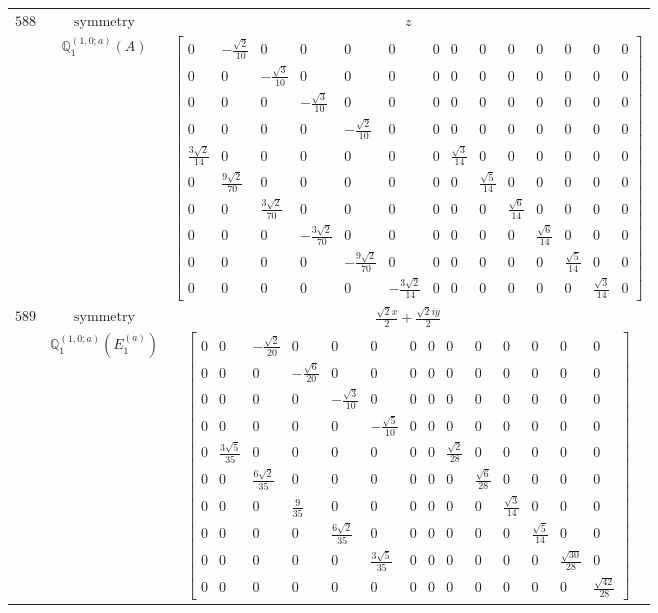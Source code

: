 \documentclass[fleqn,8pt,landscape]{jsarticle}
\begin{document}
\begin{longtable}{ccc}
$ 588 $ & $ \text{symmetry} $ & $ z $ \\
$  $ & $ \mathbb{Q}_{1}^{(1,0;a)}(A) $ & $ \begin{bmatrix} 0 & - \frac{\sqrt{2}}{10} & 0 & 0 & 0 & 0 & 0 & 0 & 0 & 0 & 0 & 0 & 0 & 0 \\ 0 & 0 & - \frac{\sqrt{3}}{10} & 0 & 0 & 0 & 0 & 0 & 0 & 0 & 0 & 0 & 0 & 0 \\ 0 & 0 & 0 & - \frac{\sqrt{3}}{10} & 0 & 0 & 0 & 0 & 0 & 0 & 0 & 0 & 0 & 0 \\ 0 & 0 & 0 & 0 & - \frac{\sqrt{2}}{10} & 0 & 0 & 0 & 0 & 0 & 0 & 0 & 0 & 0 \\ \frac{3 \sqrt{2}}{14} & 0 & 0 & 0 & 0 & 0 & 0 & \frac{\sqrt{3}}{14} & 0 & 0 & 0 & 0 & 0 & 0 \\ 0 & \frac{9 \sqrt{2}}{70} & 0 & 0 & 0 & 0 & 0 & 0 & \frac{\sqrt{5}}{14} & 0 & 0 & 0 & 0 & 0 \\ 0 & 0 & \frac{3 \sqrt{2}}{70} & 0 & 0 & 0 & 0 & 0 & 0 & \frac{\sqrt{6}}{14} & 0 & 0 & 0 & 0 \\ 0 & 0 & 0 & - \frac{3 \sqrt{2}}{70} & 0 & 0 & 0 & 0 & 0 & 0 & \frac{\sqrt{6}}{14} & 0 & 0 & 0 \\ 0 & 0 & 0 & 0 & - \frac{9 \sqrt{2}}{70} & 0 & 0 & 0 & 0 & 0 & 0 & \frac{\sqrt{5}}{14} & 0 & 0 \\ 0 & 0 & 0 & 0 & 0 & - \frac{3 \sqrt{2}}{14} & 0 & 0 & 0 & 0 & 0 & 0 & \frac{\sqrt{3}}{14} & 0 \end{bmatrix} $ \\ \hline
$ 589 $ & $ \text{symmetry} $ & $ \frac{\sqrt{2} x}{2} + \frac{\sqrt{2} i y}{2} $ \\
$  $ & $ \mathbb{Q}_{1}^{(1,0;a)}(E_{1}^{(a)}) $ & $ \begin{bmatrix} 0 & 0 & - \frac{\sqrt{2}}{20} & 0 & 0 & 0 & 0 & 0 & 0 & 0 & 0 & 0 & 0 & 0 \\ 0 & 0 & 0 & - \frac{\sqrt{6}}{20} & 0 & 0 & 0 & 0 & 0 & 0 & 0 & 0 & 0 & 0 \\ 0 & 0 & 0 & 0 & - \frac{\sqrt{3}}{10} & 0 & 0 & 0 & 0 & 0 & 0 & 0 & 0 & 0 \\ 0 & 0 & 0 & 0 & 0 & - \frac{\sqrt{5}}{10} & 0 & 0 & 0 & 0 & 0 & 0 & 0 & 0 \\ 0 & \frac{3 \sqrt{5}}{35} & 0 & 0 & 0 & 0 & 0 & 0 & \frac{\sqrt{2}}{28} & 0 & 0 & 0 & 0 & 0 \\ 0 & 0 & \frac{6 \sqrt{2}}{35} & 0 & 0 & 0 & 0 & 0 & 0 & \frac{\sqrt{6}}{28} & 0 & 0 & 0 & 0 \\ 0 & 0 & 0 & \frac{9}{35} & 0 & 0 & 0 & 0 & 0 & 0 & \frac{\sqrt{3}}{14} & 0 & 0 & 0 \\ 0 & 0 & 0 & 0 & \frac{6 \sqrt{2}}{35} & 0 & 0 & 0 & 0 & 0 & 0 & \frac{\sqrt{5}}{14} & 0 & 0 \\ 0 & 0 & 0 & 0 & 0 & \frac{3 \sqrt{5}}{35} & 0 & 0 & 0 & 0 & 0 & 0 & \frac{\sqrt{30}}{28} & 0 \\ 0 & 0 & 0 & 0 & 0 & 0 & 0 & 0 & 0 & 0 & 0 & 0 & 0 & \frac{\sqrt{42}}{28} \end{bmatrix} $ \\ \hline

\end{longtable}
\end{document}
